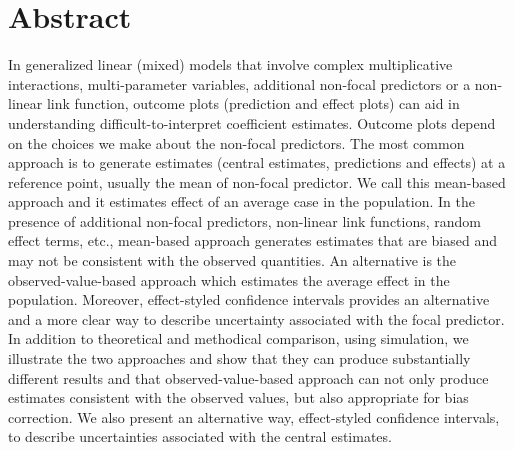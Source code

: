 \section*{Abstract}


In generalized linear (mixed) models that involve complex multiplicative interactions, multi-parameter variables, additional non-focal predictors or a non-linear link function, outcome plots (prediction and effect plots) can aid in understanding difficult-to-interpret coefficient estimates. Outcome plots depend on the choices we make about the non-focal predictors.
The most common approach is to generate estimates (central estimates, predictions and effects) at a reference point, usually the mean of non-focal predictor. We call this mean-based approach and it estimates effect of an average case in the population. In the presence of additional non-focal predictors, non-linear link functions, random effect terms, etc., mean-based approach generates estimates that are biased and may not be consistent with the observed quantities. An alternative is the observed-value-based approach which estimates the average effect in the population. Moreover, effect-styled confidence intervals provides an alternative and a more clear way to describe uncertainty associated with the focal predictor. In addition to theoretical and methodical comparison, using simulation, we illustrate the two approaches and show that they can produce substantially different results and that observed-value-based approach can not only produce estimates consistent with the observed values, but also appropriate for bias correction. We also present an alternative way, effect-styled confidence intervals, to describe uncertainties associated with the central estimates.


